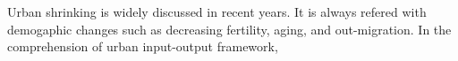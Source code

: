 Urban shrinking is widely discussed in recent years. It is always refered with demogaphic changes such as decreasing fertility, aging, and out-migration\cite{haase2008urban}. In the comprehension of urban input-output framework, 


